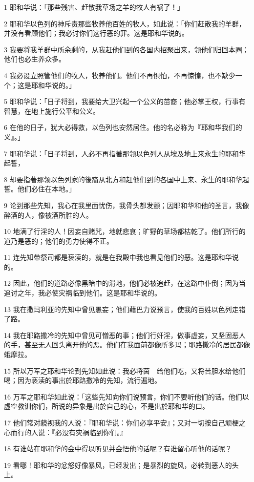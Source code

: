\par 1 耶和华说：「那些残害、赶散我草场之羊的牧人有祸了！」
\par 2 耶和华以色列的神斥责那些牧养他百姓的牧人，如此说：「你们赶散我的羊群，并没有看顾他们；我必讨你们这行恶的罪。这是耶和华说的。
\par 3 我要将我羊群中所余剩的，从我赶他们到的各国内招聚出来，领他们归回本圈；他们也必生养众多。
\par 4 我必设立照管他们的牧人，牧养他们。他们不再惧怕，不再惊惶，也不缺少一个；这是耶和华说的。」
\par 5 耶和华说：「日子将到，我要给大卫兴起一个公义的苗裔；他必掌王权，行事有智慧，在地上施行公平和公义。
\par 6 在他的日子，犹大必得救，以色列也安然居住。他的名必称为『耶和华我们的义』。」
\par 7 耶和华说：「日子将到，人必不再指著那领以色列人从埃及地上来永生的耶和华起誓，
\par 8 却要指著那领以色列家的後裔从北方和赶他们到的各国中上来、永生的耶和华起誓。他们必住在本地。」
\par 9 论到那些先知，我心在我里面忧伤，我骨头都发颤；因耶和华和他的圣言，我像醉酒的人，像被酒所胜的人。
\par 10 地满了行淫的人！因妄自赌咒，地就悲哀；旷野的草场都枯乾了。他们所行的道乃是恶的；他们的勇力使得不正。
\par 11 连先知带祭司都是亵渎的，就是在我殿中我也看见他们的恶。这是耶和华说的。
\par 12 因此，他们的道路必像黑暗中的滑地，他们必被追赶，在这路中仆倒；因为当追讨之年，我必使灾祸临到他们。这是耶和华说的。
\par 13 我在撒玛利亚的先知中曾见愚妄；他们藉巴力说预言，使我的百姓以色列走错了路。
\par 14 我在耶路撒冷的先知中曾见可憎恶的事；他们行奸淫，做事虚妄，又坚固恶人的手，甚至无人回头离开他的恶。他们在我面前都像所多玛；耶路撒冷的居民都像蛾摩拉。
\par 15 所以万军之耶和华论到先知如此说：我必将茵　给他们吃，又将苦胆水给他们喝；因为亵渎的事出於耶路撒冷的先知，流行遍地。
\par 16 万军之耶和华如此说：「这些先知向你们说预言，你们不要听他们的话。他们以虚空教训你们，所说的异象是出於自己的心，不是出於耶和华的口。
\par 17 他们常对藐视我的人说：『耶和华说：你们必享平安』；又对一切按自己顽梗之心而行的人说：『必没有灾祸临到你们。』
\par 18 有谁站在耶和华的会中得以听见并会悟他的话呢？有谁留心听他的话呢？
\par 19 看哪！耶和华的忿怒好像暴风，已经发出；是暴烈的旋风，必转到恶人的头上。
